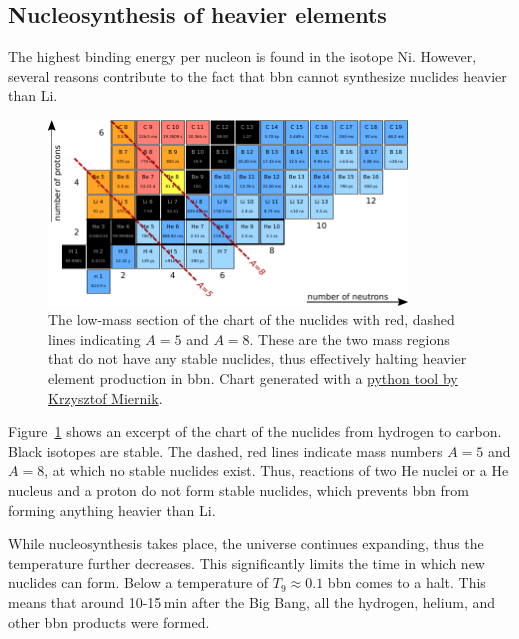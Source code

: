 \subsection{Nucleosynthesis of heavier elements}

The highest binding energy per nucleon is found in the isotope Ni. However, several reasons contribute to the fact that \ac{bbn} cannot synthesize nuclides heavier than Li.

\begin{figure}[tb]
    \centering
    \includegraphics[width=0.85\textwidth]{graphics/bbn/chart_nuclides_bbn}
    \caption{The low-mass section of the chart of the nuclides with red, dashed lines indicating $A=5$ and $A=8$. These are the two mass regions that do not have any stable nuclides, thus effectively halting heavier element production in \ac{bbn}. Chart generated with a \href{https://github.com/kmiernik/Chart-of-nuclides-drawer}{python tool by Krzysztof Miernik}.}
    \label{fig:bbn:chart_nuclides_low_mass_region}
\end{figure}
Figure~\ref{fig:bbn:chart_nuclides_low_mass_region} shows an excerpt of the chart of the nuclides from hydrogen to carbon. Black isotopes are stable. The dashed, red lines indicate mass numbers $A=5$ and $A=8$, at which no stable nuclides exist. Thus, reactions of two He nuclei or a He nucleus and a proton do not form stable nuclides, which prevents \ac{bbn} from forming anything heavier than Li. 

While nucleosynthesis takes place, the universe continues expanding, thus the temperature further decreases. This significantly limits the time in which new nuclides can form. Below a temperature of $T_9\approx 0.1$ \ac{bbn} comes to a halt. This means that around 10-15\,min after the Big Bang, all the hydrogen, helium, and other \ac{bbn} products were formed. 

